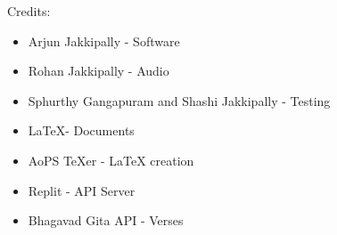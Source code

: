 \documentclass[12pt, letterpaper]{article}
\begin{document}
Credits:
\begin{itemize}
  \item Arjun Jakkipally - Software
  \item Rohan Jakkipally - Audio
  \item Sphurthy Gangapuram and Shashi Jakkipally - Testing
  \item \LaTeX - Documents
  \item AoPS \TeX er - \LaTeX{} creation
  \item Replit - API Server
  \item Bhagavad Gita API - Verses
\end{itemize}
\end{document}
